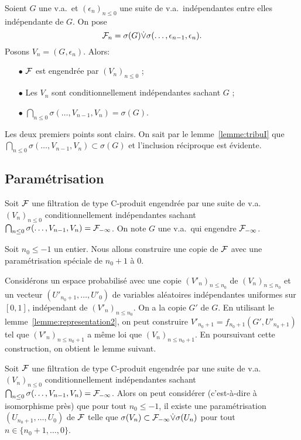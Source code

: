 \documentclass[12pt,a4paper]{article}
\begin{document}
\begin{exemple}
Soient $G$ une v.a.\ et  ${(\epsilon_n)}_{n \leq 0}$ une suite de v.a.\ indépendantes 
entre elles indépendante de $G$. On pose 
$$
\mathcal{F}_n = \sigma(G) \dot{\vee} \sigma(\ldots, \epsilon_{n-1}, \epsilon_n).
$$
Posons $V_n = (G, \epsilon_n)$. 
Alors: 
\begin{itemize}
\item[$\bullet$]  $\mathcal{F}$ est engendrée par  ${(V_n)}_{n \leq 0}$ ; 

\item[$\bullet$] Les $V_n$ sont conditionnellement indépendantes sachant $G$ ;

\item[$\bullet$]  $\bigcap_{n \leq 0}\sigma(\ldots, V_{n-1}, V_n) = \sigma(G)$.
\end{itemize}
Les deux premiers points sont clairs. 
On sait par le lemme~\ref{lemme:tribuI} que 
$\bigcap_{n \leq 0}\sigma(\ldots, V_{n-1}, V_n) \subset \sigma(G)$ et l'inclusion 
réciproque est évidente.
\end{exemple}




\subsection{Paramétrisation}

Soit $\mathcal{F}$ une filtration de type C-produit engendrée par 
une suite de v.a.\ ${(V_n)}_{n \leq 0}$ conditionnellement indépendantes 
sachant $\bigcap_{n \leq 0}\sigma(\ldots, V_{n-1}, V_n) = \mathcal{F}_{-\infty}$. 
On note $G$ une v.a.\ qui engendre $\mathcal{F}_{-\infty}$.

Soit $n_0 \leq -1$ un entier. Nous allons construire une copie de 
$\mathcal{F}$ avec une paramétrisation spéciale de $n_0+1$ à $0$. 

Considérons un espace probabilisé avec une copie ${(V'_n)}_{n \leq n_0}$ 
de ${(V_n)}_{n \leq n_0}$ et un vecteur $(U'_{n_0+1}, \ldots, U'_0)$ 
de variables aléatoires indépendantes uniformes sur $[0,1]$, indépendant 
de ${(V'_n)}_{n \leq n_0}$. 
On a la copie $G'$ de $G$. 
En utilisant le lemme~\ref{lemme:representation2}, on peut construire 
$V'_{n_0+1} = f_{n_0+1}(G', U'_{n_0+1})$ tel que 
${(V'_n)}_{n \leq n_0+1}$ a même loi que ${(V_n)}_{n \leq n_0+1}$. 
En poursuivant cette construction, on obtient le lemme suivant. 

\begin{lemme}\label{lemme:parametrisation}
Soit $\mathcal{F}$ une filtration de type C-produit engendrée par 
une suite de v.a.\ ${(V_n)}_{n \leq 0}$  conditionnellement indépendantes 
sachant $\bigcap_{n \leq 0}\sigma(\ldots, V_{n-1}, V_n) = \mathcal{F}_{-\infty}$. 
Alors on peut considérer (c'est-à-dire à isomorphisme près) que 
pour tout $n_0 \leq -1$, il existe une paramétrisation 
$(U_{n_0+1}, \ldots, U_0)$  de $\mathcal{F}$ 
telle que $\sigma(V_n) \subset \mathcal{F}_{-\infty} \dot{\vee} \sigma(U_n)$ 
pour tout  $n \in \{n_0+1, \ldots, 0\}$.
\end{lemme}
\end{document}
